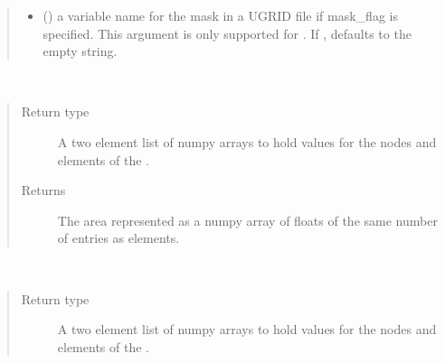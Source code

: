 \documentclass[letterpaper,10pt,english]{sphinxmanual}
\begin{document}
\begin{fulllineitems}
\begin{quote}
\begin{description}
\begin{itemize}
\item {} 
 () \textendash{} a variable name for the mask in a UGRID file
if mask\_flag is specified.  This argument is only supported
for {\hyperref[\detokenize{FileFormat:ESMF.api.constants.FileFormat.UGRID}]{}}.
If , defaults to the empty string.

\end{itemize}

\end{description}\end{quote}

\begin{fulllineitems}
\label{\detokenize{mesh:ESMF.api.mesh.Mesh.area}}~\begin{quote}\begin{description}
\item[{Return type}] \leavevmode
A two element list of numpy arrays to hold values for the nodes
and elements of the {\hyperref[\detokenize{mesh:ESMF.api.mesh.Mesh}]{}}.

\item[{Returns}] \leavevmode
The {\hyperref[\detokenize{mesh:ESMF.api.mesh.Mesh}]{}} area represented as a numpy
array of floats of the same number of entries as {\hyperref[\detokenize{mesh:ESMF.api.mesh.Mesh}]{}} elements.

\end{description}\end{quote}

\end{fulllineitems}


\begin{fulllineitems}
\label{\detokenize{mesh:ESMF.api.mesh.Mesh.coords}}~\begin{quote}\begin{description}
\item[{Return type}] \leavevmode
A two element list of numpy arrays to hold values for the nodes
and elements of the {\hyperref[\detokenize{mesh:ESMF.api.mesh.Mesh}]{}}.


\end{description}
\end{quote}
\end{fulllineitems}
\end{fulllineitems}
\end{document}
